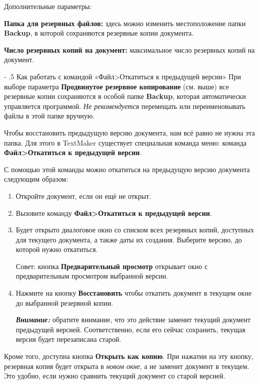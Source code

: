 ﻿\documentclass[a4paper,10pt]{article}
\makeatletter
\renewcommand\paragraph{%
   \@startsection{paragraph}{4}{0mm}%
      {-\baselineskip}%
      {.5\baselineskip}%
      {\normalfont\normalsize\bfseries}}
\makeatother
\begin{document}
 Дополнительные параметры:
 
 \textbf{Папка для резервных файлов:} здесь можно изменить местоположение папки \textbf{Backup}, в которой сохраняются резервные копии документа.
 
 \textbf{Число резервных копий на документ:} максимальное число резервных копий на документ.
 
 \paragraph{Как работать с командой «Файл>Откатиться к предыдущей версии»}
 При выборе параметра \textbf{Продвинутое резервное копирование} (см. выше) все резервные копии сохраняются в особой папке \textbf{Backup}, которая автоматически управляется программой. \textit{Не рекомендуется} перемещать или переименовывать файлы в этой папке вручную.
 
 Чтобы восстановить предыдущую версию документа, нам всё равно не нужна эта папка. Для этого в TextMaker существует специальная команда меню: команда \textbf{Файл>Откатиться к предыдущей версии}.
 
 С помощью этой команды можно откатиться на предыдущую версию документа следующим образом:
 \begin{enumerate}
  \item Откройте документ, если он ещё не открыт.
  \item Вызовите команду \textbf{Файл>Откатиться к предыдущей версии}.
  \item Будет открыто диалоговое окно со списком всех резервных копий, доступных для текущего документа, а также даты их создания. Выберите версию, до которой нужно откатиться.
  
  Совет: кнопка \textbf{Предварительный просмотр} открывает окно с предварительным просмотром выбранной версии.
  \item Нажмите на кнопку \textbf{Восстановить} чтобы откатить документ в текущем окне до выбранной резервной копии.
  
  \begin{mdframed}[backgroundcolor=blue!10]
\textbf{\textit{Внимание:}} обратите внимание, что это действие заменит текущий документ предыдущей версией. Соответственно, если его сейчас сохранить, текущая версия будет перезаписана старой.
\end{mdframed}
\end{enumerate}

Кроме того, доступна кнопка \textbf{Открыть как копию}. При нажатии на эту кнопку, резервная копия будет открыта в \textit{новом окне}, а не заменит документ в текущем. Это удобно, если нужно сравнить текущий документ со старой версией.
\end{document}
